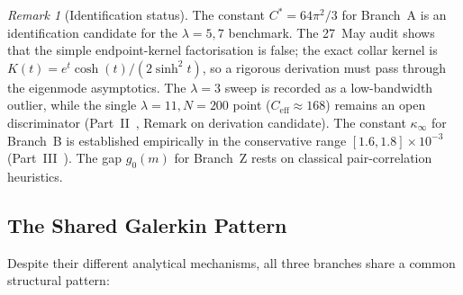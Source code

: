 \documentclass[12pt,a4paper]{article}
\theoremstyle{definition}
\theoremstyle{remark}
\newtheorem{remark}[theorem]{Remark}
\begin{document}
\begin{center}
\renewcommand{\arraystretch}{1.3}
\end{center}

\begin{remark}[Identification status]
The constant $C^* = 64\pi^2/3$ for Branch~A is an identification
candidate for the $\lambda=5,7$ benchmark. The 27~May audit shows that the
simple endpoint-kernel factorisation is false; the exact collar kernel is
$K(t)=e^t\cosh(t)/(2\sinh^2t)$, so a rigorous derivation must pass through
the eigenmode asymptotics. The $\lambda=3$ sweep is recorded as a
low-bandwidth outlier, while the single $\lambda=11,N=200$ point
($C_{\mathrm{eff}}\approx168$) remains an open discriminator
(Part~II~\cite{Geiger2026partII}, Remark on derivation candidate). The
constant $\kappa_\infty$ for Branch~B is established empirically in the
conservative range $[1.6,1.8]\times 10^{-3}$ (Part~III~\cite{Geiger2026partIII}). The gap
$g_0(m)$ for Branch~Z rests on classical pair-correlation heuristics.
\end{remark}


\subsection{The Shared Galerkin Pattern}

Despite their different analytical mechanisms, all three branches share a
common structural pattern:
\end{document}
